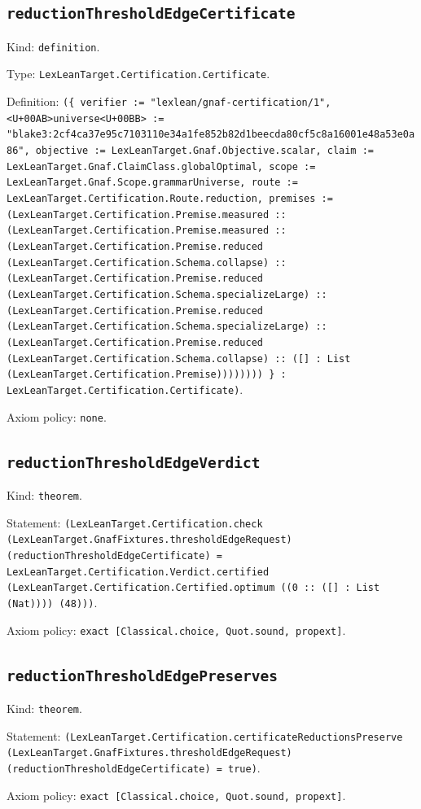 \documentclass[11pt]{article}
\begin{document}
\subsection*{\texttt{reductionThresholdEdgeCertificate}}
\noindent Kind: \texttt{definition}.\par
\noindent Type: \texttt{LexLeanTarget.Certification.Certificate}.\par
\noindent Definition: \texttt{(\{ verifier := "lexlean/gnaf-certification/1", <U+00AB>universe<U+00BB> := "blake3:2cf4ca37e95c7103110e34a1fe852b82d1beecda80cf5c8a16001e48a53e0a86", objective := LexLeanTarget.Gnaf.Objective.scalar, claim := LexLeanTarget.Gnaf.ClaimClass.globalOptimal, scope := LexLeanTarget.Gnaf.Scope.grammarUniverse, route := LexLeanTarget.Certification.Route.reduction, premises := (LexLeanTarget.Certification.Premise.measured :: (LexLeanTarget.Certification.Premise.measured :: (LexLeanTarget.Certification.Premise.reduced (LexLeanTarget.Certification.Schema.collapse) :: (LexLeanTarget.Certification.Premise.reduced (LexLeanTarget.Certification.Schema.specializeLarge) :: (LexLeanTarget.Certification.Premise.reduced (LexLeanTarget.Certification.Schema.specializeLarge) :: (LexLeanTarget.Certification.Premise.reduced (LexLeanTarget.Certification.Schema.collapse) :: ([] : List (LexLeanTarget.Certification.Premise)))))))) \} : LexLeanTarget.Certification.Certificate)}.\par
\noindent Axiom policy: \texttt{none}.\par
\subsection*{\texttt{reductionThresholdEdgeVerdict}}
\noindent Kind: \texttt{theorem}.\par
\noindent Statement: \texttt{(LexLeanTarget.Certification.check (LexLeanTarget.GnafFixtures.thresholdEdgeRequest) (reductionThresholdEdgeCertificate) = LexLeanTarget.Certification.Verdict.certified (LexLeanTarget.Certification.Certified.optimum ((0 :: ([] : List (Nat)))) (48)))}.\par
\noindent Axiom policy: \texttt{exact [Classical.choice, Quot.sound, propext]}.\par
\subsection*{\texttt{reductionThresholdEdgePreserves}}
\noindent Kind: \texttt{theorem}.\par
\noindent Statement: \texttt{(LexLeanTarget.Certification.certificateReductionsPreserve (LexLeanTarget.GnafFixtures.thresholdEdgeRequest) (reductionThresholdEdgeCertificate) = true)}.\par
\noindent Axiom policy: \texttt{exact [Classical.choice, Quot.sound, propext]}.\par
\end{document}
